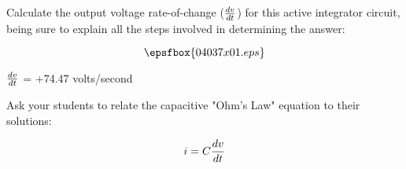 

Calculate the output voltage rate-of-change ($dv \over dt$) for this active integrator circuit, being sure to explain all the steps involved in determining the answer:

$$\epsfbox{04037x01.eps}$$







$dv \over dt$ = +74.47 volts/second







Ask your students to relate the capacitive "Ohm's Law" equation to their solutions:

$$i = C {dv \over dt}$$




